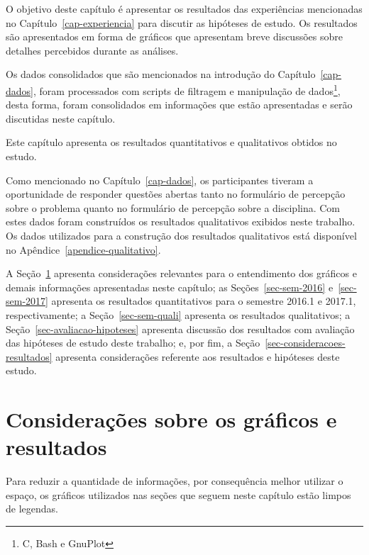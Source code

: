 

\label{cap-resultados}
\acresetall

O objetivo deste capítulo é apresentar os resultados das experiências
mencionadas no Capítulo~\ref{cap-experiencia} para discutir as
hipóteses de estudo.
Os resultados são apresentados em forma de gráficos que apresentam
breve discussões sobre detalhes percebidos durante as análises.

Os dados consolidados que são mencionados na introdução
do Capítulo~\ref{cap-dados}, foram processados com
scripts de filtragem e manipulação
de dados\footnote{C, Bash e GnuPlot}, desta forma,
foram consolidados em informações que estão
apresentadas e serão discutidas neste capítulo.

Este capítulo apresenta os resultados quantitativos
e qualitativos obtidos no estudo.

Como mencionado no Capítulo~\ref{cap-dados}, os participantes
tiveram a oportunidade de responder questões abertas tanto no
formulário de percepção sobre o problema quanto no formulário
de percepção sobre a disciplina.
Com estes dados foram construídos os resultados qualitativos
exibidos neste trabalho.
Os dados utilizados para a construção dos resultados
qualitativos está disponível no Apêndice~\ref{apendice-qualitativo}.

A Seção~\ref{sec-ref-graficos} apresenta considerações relevantes para o
entendimento dos gráficos e demais informações apresentadas neste capítulo;
as Seções~\ref{sec-sem-2016} e~\ref{sec-sem-2017}
apresenta os resultados quantitativos para o semestre 2016.1 e 2017.1, respectivamente;
a Seção~\ref{sec-sem-quali} apresenta os resultados qualitativos;
a Seção~\ref{sec-avaliacao-hipoteses} apresenta discussão dos resultados
com avaliação das hipóteses de estudo deste trabalho;
e, por fim, a Seção~\ref{sec-consideracoes-resultados} apresenta
considerações referente aos resultados e hipóteses
deste estudo.

\section{Considerações sobre os gráficos e resultados}
\label{sec-ref-graficos}
Para reduzir a quantidade de informações, por consequência melhor utilizar o
espaço, os gráficos utilizados nas seções que seguem neste capítulo
estão limpos de legendas.

